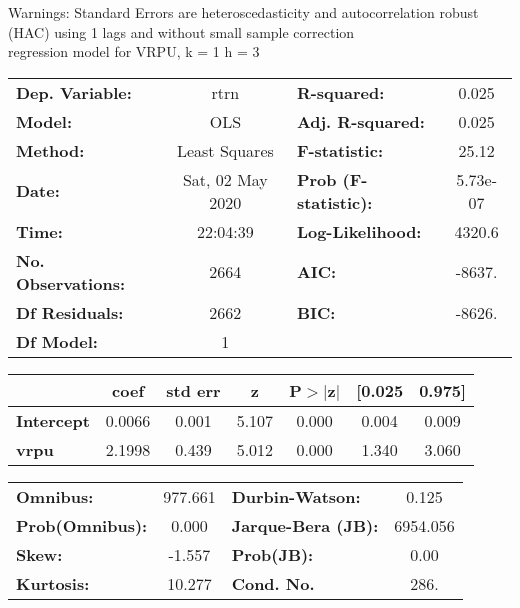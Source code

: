 Warnings: \newline
 [1] Standard Errors are heteroscedasticity and autocorrelation robust (HAC) using 1 lags and without small sample correction\\ 

regression model for VRPU, k = 1 h = 3\begin{center}
\begin{tabular}{lclc}
\toprule
\textbf{Dep. Variable:}    &       rtrn       & \textbf{  R-squared:         } &     0.025   \\
\textbf{Model:}            &       OLS        & \textbf{  Adj. R-squared:    } &     0.025   \\
\textbf{Method:}           &  Least Squares   & \textbf{  F-statistic:       } &     25.12   \\
\textbf{Date:}             & Sat, 02 May 2020 & \textbf{  Prob (F-statistic):} &  5.73e-07   \\
\textbf{Time:}             &     22:04:39     & \textbf{  Log-Likelihood:    } &    4320.6   \\
\textbf{No. Observations:} &        2664      & \textbf{  AIC:               } &    -8637.   \\
\textbf{Df Residuals:}     &        2662      & \textbf{  BIC:               } &    -8626.   \\
\textbf{Df Model:}         &           1      & \textbf{                     } &             \\
\bottomrule
\end{tabular}
\begin{tabular}{lcccccc}
                   & \textbf{coef} & \textbf{std err} & \textbf{z} & \textbf{P$> |$z$|$} & \textbf{[0.025} & \textbf{0.975]}  \\
\midrule
\textbf{Intercept} &       0.0066  &        0.001     &     5.107  &         0.000        &        0.004    &        0.009     \\
\textbf{vrpu}      &       2.1998  &        0.439     &     5.012  &         0.000        &        1.340    &        3.060     \\
\bottomrule
\end{tabular}
\begin{tabular}{lclc}
\textbf{Omnibus:}       & 977.661 & \textbf{  Durbin-Watson:     } &    0.125  \\
\textbf{Prob(Omnibus):} &   0.000 & \textbf{  Jarque-Bera (JB):  } & 6954.056  \\
\textbf{Skew:}          &  -1.557 & \textbf{  Prob(JB):          } &     0.00  \\
\textbf{Kurtosis:}      &  10.277 & \textbf{  Cond. No.          } &     286.  \\
\bottomrule
\end{tabular}
\end{center}

